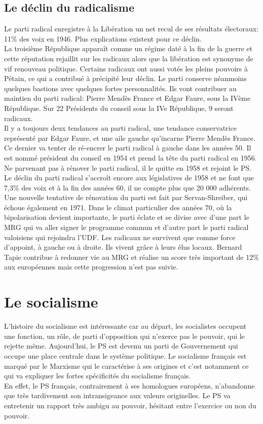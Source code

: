 \documentclass[10pt, a4paper, openany]{book}
\begin{document}
\section{Le déclin du radicalisme}

Le parti radical enregistre à la Libération un net recul de ses résultats électoraux: 11\% des voix en 1946. Plus explications existent pour ce déclin. \\
La troisième République apparaît comme un régime daté à la fin de la guerre et cette réputation rejaillit sur les radicaux alors que la libération est synonyme de vif renouveau politique. Certains radicaux ont aussi votés les pleins pouvoirs à Pétain, ce qui a contribué à précipité leur déclin. Le parti conserve néanmoins quelques bastions avec quelques fortes personnalités. Ils vont contribuer au maintien du parti radical: Pierre Mendès France et Edgar Faure, sous la IVème République. Sur 22 Présidents du conseil sous la IVe République, 9 seront radicaux. \\
Il y a toujours deux tendances au parti radical, une tendance conservatrice représenté par Edgar Faure, et une aile gauche qu'incarne Pierre Mendès France. Ce dernier va tenter de ré-encrer le parti radical à gauche dans les années 50. Il est nommé président du conseil en 1954 et prend la tête du parti radical en 1956. Ne parvenant pas à rénover le parti radical, il le quitte en 1958 et rejoint le PS. \\
Le déclin du parti radical s'accroît encore aux législatives de 1958 et ne font que 7,3\% des voix et à la fin des années 60, il ne compte plus que 20 000 adhérents. Une nouvelle tentative de rénovation du parti est fait par Servan-Shreiber, qui échoue également en 1971. Dans le climat particulier des années 70, où la bipolarisation devient importante, le parti éclate et se divise avec d'une part le MRG qui va aller signer le programme commun et d'autre part le parti radical valoisiens qui rejoindra l'UDF. Les radicaux ne survivent que comme force d'appoint, à gauche ou à droite. Ils vivent grâce à leurs élus locaux. Bernard Tapie contribue à redonner vie au MRG et réalise un score très important de 12\% aux européennes mais cette progression n'est pas suivie. 


\chapter{Le socialisme}

L'histoire du socialisme est intéressante car au départ, les socialistes occupent une fonction, un rôle, de parti d'opposition qui n'exerce pas le pouvoir, qui le rejette même. Aujourd'hui, le PS est devenu un parti de Gouvernement qui occupe une place centrale dans le système politique. Le socialisme français est marqué par le Marxisme qui le caractérise à ses origines et c'est notamment ce qui va expliquer les fortes spécificités du socialisme français. \\
En effet, le PS français, contrairement à ses homologues européens, n'abandonne que très tardivement son intransigeance aux valeurs originelles. Le PS va entretenir un rapport très ambigu au pouvoir, hésitant entre l'exercice ou non du pouvoir. 
\end{document}
